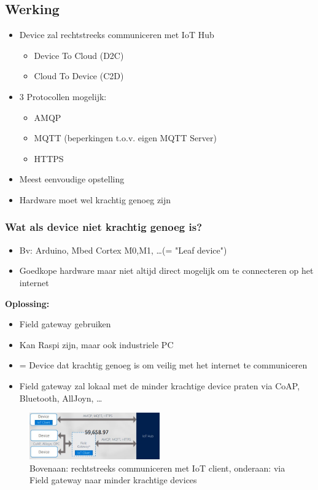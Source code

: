 \documentclass{article}
\newcommand{\bold}[1]{\textbf{#1}}
\begin{document}
\subsection{Werking}

\begin{itemize}
    \item Device zal rechtstreeks communiceren met IoT Hub
    \begin{itemize}
        \item Device To Cloud (D2C)
        \item Cloud To Device (C2D)
    \end{itemize}
    \item 3 Protocollen mogelijk:
    \begin{itemize}
        \item AMQP
        \item MQTT (beperkingen t.o.v. eigen MQTT Server)
        \item HTTPS
    \end{itemize}
    \item Meest eenvoudige opstelling
    \item Hardware moet wel krachtig genoeg zijn
\end{itemize}

\subsubsection{Wat als device niet krachtig genoeg is?}

\begin{itemize}
    \item Bv: Arduino, Mbed Cortex M0,M1, \dots (= "Leaf device")
    \item Goedkope hardware maar niet altijd direct mogelijk om te connecteren op het internet
\end{itemize}

\bold{Oplossing:}
\begin{itemize}
    \item Field gateway gebruiken
    \item Kan Raspi zijn, maar ook industriele PC
    \item = Device dat krachtig genoeg is om veilig met het internet te communiceren
    \item Field gateway zal lokaal met de minder krachtige device praten via CoAP, Bluetooth, AllJoyn, \dots
\end{itemize}

\begin{figure}[H]
    \centering
    \includegraphics[width=0.5\textwidth]{iot-hub.png}
    \caption{Bovenaan: rechtstreeks communiceren met IoT client, onderaan: via Field gateway naar minder krachtige devices}
\end{figure}
\end{document}
